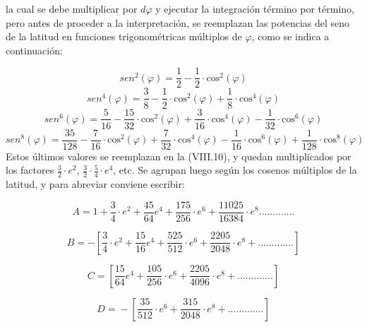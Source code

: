 \documentclass[]{article}
\begin{document}
la cual se debe multiplicar por \({d\varphi }\) y ejecutar la
integración término por término, pero antes de proceder a la
interpretación, se reemplazan las potencias del seno de la latitud en
funciones trigonométricas múltiplos de \({\varphi }\), como se indica a
continuación:

\[{sen^{{2}}\left(\varphi
\right)=\frac{1}{2}-\frac{1}{2}\cdot \text{cos}^{{2}}\left(\varphi
\right)}\] \[{sen^{{4}}\left(\varphi
\right)=\frac{3}{8}-\frac{1}{2}\cdot \text{cos}^{{2}}\left(\varphi
\right)+\frac{1}{8}\cdot \text{cos}^{{4}}\left(\varphi \right)}\]
\[{sen^{{6}}\left(\varphi
\right)=\frac{5}{\text{16}}-\frac{\text{15}}{\text{32}}\cdot
\text{cos}^{{2}}\left(\varphi \right)+\frac{3}{\text{16}}\cdot
\text{cos}^{{4}}\left(\varphi \right)-\frac{1}{\text{32}}\cdot
\text{cos}^{{6}}\left(\varphi \right)}\] \[{sen^{{8}}\left(\varphi
\right)=\frac{\text{35}}{\text{128}}-\frac{7}{\text{16}}\cdot
\text{cos}^{{2}}\left(\varphi \right)+\frac{7}{\text{32}}\cdot
\text{cos}^{{4}}\left(\varphi \right)-\frac{1}{\text{16}}\cdot
\text{cos}^{{6}}\left(\varphi \right)+\frac{1}{\text{128}}\cdot
\text{cos}^{{8}}\left(\varphi \right)}\] Estos últimos valores se
reemplazan en la (VIII.10), y quedan multiplicados por los factores
\({\frac{3}{2}\cdot e^{{2}}}\),
\({\frac{3}{2}\cdot {\frac{5}{4}}\cdot e^{{4}}}\), etc. Se agrupan luego
según los cosenos múltiplos de la latitud, y para abreviar conviene
escribir:

\[{A=1+\frac{3}{4}\cdot
e^{{2}}+\frac{\text{45}}{\text{64}}e^{{4}}+\frac{\text{175}}{\text{256}}\cdot
e^{{6}}+\frac{\text{11025}}{\text{16384}}\cdot
e^{{8}}\text{.}\text{.}\text{.}\text{.}\text{.}\text{.}\text{.}\text{.}\text{.}\text{.}\text{.}\text{.}\text{.}}\]

\[{B=-\left[\frac{3}{4}\cdot
e^{{2}}+\frac{\text{15}}{\text{16}}e^{{4}}+\frac{\text{525}}{\text{512}}\cdot
e^{{6}}+\frac{\text{2205}}{\text{2048}}\cdot
e^{{8}}+\text{.}\text{.}\text{.}\text{.}\text{.}\text{.}\text{.}\text{.}\text{.}\text{.}\text{.}\text{.}\text{.}\right]}\]

\[{C=\overset{}{{}}\overset{}{{}}\overset{}{{}}\overset{}{{}}\overset{}{{}}\left[\frac{\text{15}}{\text{64}}e^{{4}}+\frac{\text{105}}{\text{256}}\cdot e^{{6}}+\frac{\text{2205}}{\text{4096}}\cdot e^{{8}}+\text{.}\text{.}\text{.}\text{.}\text{.}\text{.}\text{.}\text{.}\text{.}\text{.}\text{.}\text{.}\text{.}\right]}\]

\[{D=\overset{}{{}}\overset{}{{}}\overset{}{{}}\overset{}{{}}\overset{}{{}}\overset{}{{}}\overset{}{{}}\overset{}{{}}\overset{}{{}}-\left[\frac{\text{35}}{\text{512}}\cdot
e^{{6}}+\frac{\text{315}}{\text{2048}}\cdot
e^{{8}}+\text{.}\text{.}\text{.}\text{.}\text{.}\text{.}\text{.}\text{.}\text{.}\text{.}\text{.}\text{.}\text{.}\right]}\]
\end{document}
